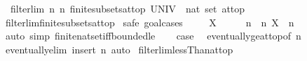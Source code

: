 \begin{isabellebody}
\ \ {\isachardoublequoteopen}filterlim\ {\isacharparenleft}{\kern0pt}{\isasymlambda}n{\isachardot}{\kern0pt}\ {\isacharbraceleft}{\kern0pt}{\isachardot}{\kern0pt}{\isachardot}{\kern0pt}n{\isacharbraceright}{\kern0pt}{\isacharparenright}{\kern0pt}\ {\isacharparenleft}{\kern0pt}finite{\isacharunderscore}{\kern0pt}subsets{\isacharunderscore}{\kern0pt}at{\isacharunderscore}{\kern0pt}top\ {\isacharparenleft}{\kern0pt}UNIV\ {\isacharcolon}{\kern0pt}{\isacharcolon}{\kern0pt}\ nat\ set{\isacharparenright}{\kern0pt}{\isacharparenright}{\kern0pt}\ at{\isacharunderscore}{\kern0pt}top{\isachardoublequoteclose}\isanewline
%
\isadelimproof
\ \ %
\endisadelimproof
%
\isatagproof
{}\isamarkupfalse%
\ filterlim{\isacharunderscore}{\kern0pt}finite{\isacharunderscore}{\kern0pt}subsets{\isacharunderscore}{\kern0pt}at{\isacharunderscore}{\kern0pt}top\isanewline
{}\isamarkupfalse%
\ {\isacharparenleft}{\kern0pt}safe{\isacharcomma}{\kern0pt}\ goal{\isacharunderscore}{\kern0pt}cases{\isacharparenright}{\kern0pt}\isanewline
\ \ \isamarkupfalse%
\ {\isacharparenleft}{\kern0pt}{}\ X{\isacharparenright}{\kern0pt}\isanewline
\ \ \isamarkupfalse%
\ \isamarkupfalse%
\ n\ \ n{\isacharcolon}{\kern0pt}\ {\isachardoublequoteopen}X\ {\isasymsubseteq}\ {\isacharbraceleft}{\kern0pt}{\isachardot}{\kern0pt}{\isachardot}{\kern0pt}n{\isacharbraceright}{\kern0pt}{\isachardoublequoteclose}\ \isamarkupfalse%
\ {\isacharparenleft}{\kern0pt}auto\ simp{\isacharcolon}{\kern0pt}\ finite{\isacharunderscore}{\kern0pt}nat{\isacharunderscore}{\kern0pt}set{\isacharunderscore}{\kern0pt}iff{\isacharunderscore}{\kern0pt}bounded{\isacharunderscore}{\kern0pt}le{\isacharparenright}{\kern0pt}\isanewline
\ \ \isamarkupfalse%
\ {\isacharquery}{\kern0pt}case\ \isamarkupfalse%
\ eventually{\isacharunderscore}{\kern0pt}ge{\isacharunderscore}{\kern0pt}at{\isacharunderscore}{\kern0pt}top{\isacharbrackleft}{\kern0pt}of\ n{\isacharbrackright}{\kern0pt}\isanewline
\ \ \ \ \isamarkupfalse%
\ eventually{\isacharunderscore}{\kern0pt}elim\ {\isacharparenleft}{\kern0pt}insert\ n{\isacharcomma}{\kern0pt}\ auto{\isacharparenright}{\kern0pt}\isanewline
{}\isamarkupfalse%
%
\endisatagproof
{\isafoldproof}%
%
\isadelimproof
\isanewline
%
\endisadelimproof
\isanewline
{}\isamarkupfalse%
\ filterlim{\isacharunderscore}{\kern0pt}lessThan{\isacharunderscore}{\kern0pt}at{\isacharunderscore}{\kern0pt}top{\isacharcolon}{\kern0pt}\isanewline

\end{isabellebody}
